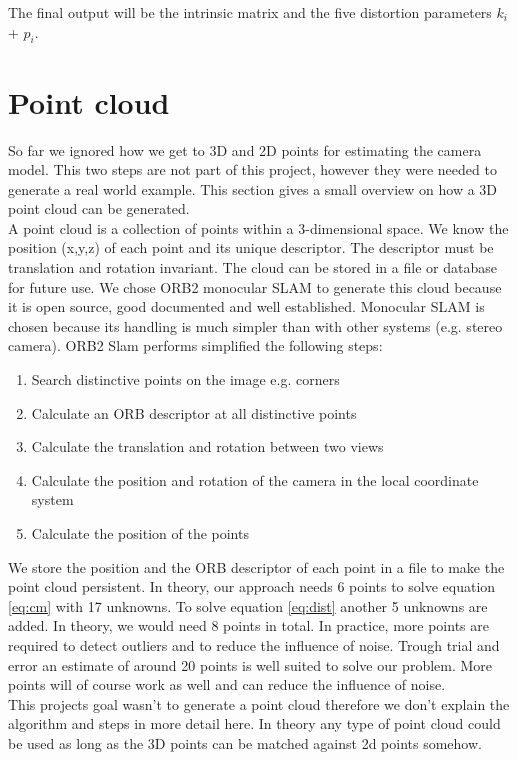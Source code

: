 \documentclass[11pt,a4paper,titlepage,oneside]{report}
\begin{document}
The final output will be the intrinsic matrix and the five distortion parameters $k_i$ + $p_i$.

\section{Point cloud}
So far we ignored how we get to 3D and 2D points for estimating the camera model. This two steps are not part of this project, however they were needed to generate a real world example. This section gives a small overview on how a 3D point cloud can be generated.\\
A point cloud is a collection of points within a 3-dimensional space. We know the position (x,y,z) of each point and its unique descriptor. The descriptor must be translation and rotation invariant. The cloud can be stored in a file or database for future use. We chose ORB2 monocular SLAM \cite{orbslam2} to generate this cloud because it is open source, good documented and well established. Monocular SLAM is chosen because its handling is much simpler than with other systems (e.g. stereo camera). ORB2 Slam performs simplified the following steps:
\begin{enumerate}
\item Search distinctive points on the image e.g. corners
\item Calculate an ORB descriptor at all distinctive points
\item Calculate the translation and rotation between two views
\item Calculate the position and rotation of the camera in the local coordinate system
\item Calculate the position of the points
\end{enumerate}
We store the position and the ORB descriptor of each point in a file to make the point cloud persistent.
In theory, our approach needs 6 points to solve equation \ref{eq:cm} with 17 unknowns. To solve equation \ref{eq:dist} another 5 unknowns are added. In theory, we would need 8 points in total. In practice, more points are required to detect outliers and to reduce the influence of noise. Trough trial and error an estimate of around 20 points is well suited to solve our problem. More points will of course work as well and can reduce the influence of noise.\\
This projects goal wasn't to generate a point cloud therefore we don't explain the algorithm and steps in more detail here. In theory any type of point cloud could be used as long as the 3D points can be matched against 2d points somehow.
\end{document}
